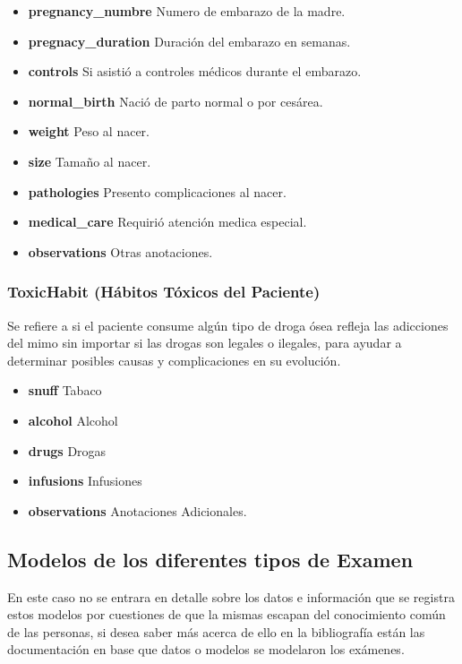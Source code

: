 \begin{itemize}
    \item \textbf{pregnancy\_numbre} Numero de embarazo de la madre.
    \item \textbf{pregnacy\_duration} Duración del embarazo en semanas.
    \item \textbf{controls} Si asistió a controles médicos durante el embarazo.
    \item \textbf{normal\_birth} Nació de parto normal o por cesárea.
    \item \textbf{weight} Peso al nacer.
    \item \textbf{size} Tamaño al nacer.
    \item \textbf{pathologies} Presento complicaciones al nacer.
    \item \textbf{medical\_care} Requirió atención medica especial.
    \item \textbf{observations} Otras anotaciones.
\end{itemize}

\subsubsection{ToxicHabit (Hábitos Tóxicos del Paciente)} 

Se refiere a si el paciente consume algún tipo de droga ósea refleja las adicciones del mimo sin importar si las drogas son legales o ilegales, para ayudar a determinar posibles causas y complicaciones en su evolución.

\begin{itemize}
    \item \textbf{snuff} Tabaco
    \item \textbf{alcohol} Alcohol
    \item \textbf{drugs} Drogas
    \item \textbf{infusions} Infusiones
    \item \textbf{observations} Anotaciones Adicionales. 
\end{itemize}


\subsection{Modelos de los diferentes tipos de Examen}

En este caso no se entrara en detalle sobre los datos e información que se registra estos modelos por cuestiones de que la mismas escapan del conocimiento común de las personas, si desea saber más acerca de ello en la bibliografía están las documentación en base que datos o modelos se modelaron los exámenes.


